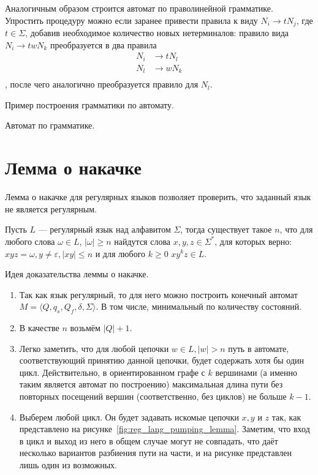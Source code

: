 Аналогичным образом строится автомат по праволинейной грамматике.
Упростить процедуру можно если заранее привести правила к виду $N_i \to tN_j$, где $t\in \Sigma$, добавив необходимое количество новых нетерминалов:
правило вида $N_i \to twN_k$ преобразуется в два правила 
\begin{align*}
    N_i& \to tN_l\\
    N_l& \to wN_k \\
\end{align*}
, после чего аналогично преобразуется правило для $N_l$.

Пример построения грамматики по автомату.

Автомат по грамматике. 

\section{Лемма о накачке}

Лемма о накачке для регулярных языков позволяет проверить, что заданный язык не является регулярным.

\begin{lemma}
    Пусть $L$ --- регулярный язык над алфавитом $\Sigma$, тогда существует такое $n$, что для любого слова $\omega \in L$, $|\omega| \geq n$ найдутся слова $x,y,z\in \Sigma^*$, для которых верно: $xyz = \omega, y\neq \varepsilon,|xy|\leq n$ и для любого $k \geq 0$  $xy^kz \in L$.
\end{lemma}

Идея доказательства леммы о накачке.

\begin{enumerate}
    \item Так как язык регулярный, то для него можно построить конечный автомат $M = \langle Q, q_s,Q_f, \delta, \Sigma \rangle$. В том числе, минимальный по количеству состояний.
    \item В качестве $n$ возьмём $|Q| + 1$.
    \item Легко заметить, что для любой цепочки $w \in L, |w| > n$ путь в автомате, соответствующий принятию данной цепочки, будет содержать хотя бы один цикл.
          Действительно, в ориентированном графе с $k$ вершинами (а именно таким является автомат по построению) максимальная длина пути без повторных посещений вершин (соответственно, без циклов) не больше $k - 1$.
    \item Выберем любой цикл. Он будет задавать искомые цепочки $x, y$ и $z$ так, как представлено на рисунке~\ref{fig:reg_lang_pumping_lemma}.
    Заметим, что вход в цикл и выход из него в общем случае могут не совпадать, что даёт несколько вариантов разбиения пути на части, и на рисунке представлен лишь один из возможных.
\end{enumerate}

